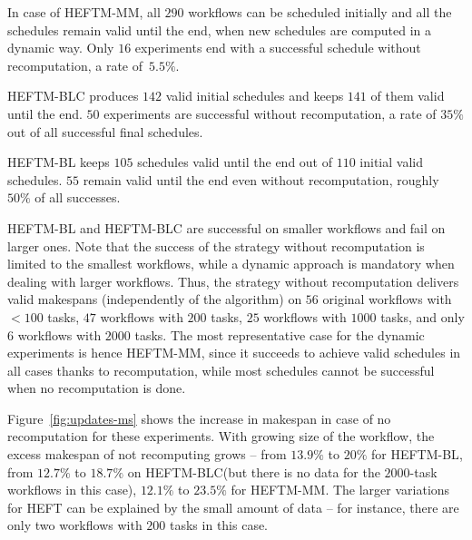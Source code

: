 \documentclass[conference]{IEEEtran}
\newcommand{\algo}[1]{\textsc{#1}}
\newcommand{\heft}{\algo{HEFT}\xspace}
\newcommand{\heftmm}{\algo{HEFTM-MM}\xspace}
\newcommand{\heftbl}{\algo{HEFTM-BL}\xspace}
\newcommand{\heftblc}{\algo{HEFTM-BLC}\xspace}
\newcommand{\new}[1]{{\color{blue}#1}}
\begin{document}
In case of \heftmm, all $290$ workflows can be scheduled initially and all the schedules remain valid until the end,
\new{when new schedules are computed in a dynamic way. Only}  
$16$ experiments end with a successful schedule without recomputation, a rate of~$5.5\%$.

\heftblc produces $142$ valid initial schedules and keeps $141$ of them valid until the end.
$50$ experiments are successful without recomputation, a rate of $35\%$ out of all successful final schedules.

\heftbl keeps $105$ schedules valid until the end out of $110$ initial valid schedules.
$55$ remain valid until the end even without recomputation, roughly $50\%$ of all successes.

\heftbl and \heftblc are successful on smaller workflows and fail on larger ones. 
\new{Note that the success of the strategy without recomputation is limited to  the smallest  workflows,
while a dynamic approach is mandatory when dealing with larger workflows.}
Thus, the strategy without recomputation delivers valid makespans (independently of the algorithm) 
on $56$ original workflows with $<100$ tasks, \new{$47$ workflows with  $200$ tasks, 
$25$ workflows with $1000$ tasks, and only $6$ workflows with $2000$ tasks.
The most representative case for the dynamic experiments is hence \heftmm, since it succeeds
to achieve valid schedules in all cases thanks to recomputation, while most schedules
cannot be successful when no recomputation is done. 
}



Figure~\ref{fig:updates-ms} shows the increase in makespan in case of no recomputation for these experiments.
With growing size of the workflow, the excess makespan of not recomputing grows -- from $13.9\%$ to $20\%$ for \heftbl,
from $12.7\%$ to $18.7\%$ on \heftblc (but there is no data for the $2000$-task workflows in this case),
$12.1\%$ to $23.5\%$ for \heftmm.
The larger variations for \heft can be explained by the small amount of data -- for instance, there are
only \new{two workflows with  $200$ tasks in this case.}
\end{document}
